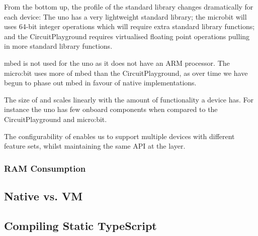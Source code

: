 From the bottom up, the profile of the standard library changes dramatically for each device: The uno has a very lightweight standard library; the microbit will uses 64-bit integer operations which will require extra standard library functions; and the CircuitPlayground requires virtualised floating point operations pulling in more standard library functions.

mbed is not used for the uno as it does not have an ARM processor. The micro:bit uses more of mbed than the CircuitPlayground, as over time we have begun to phase out mbed in favour of native implementations.

The size of \CO and \MC scales linearly with the amount of functionality a device has. For instance the uno has few onboard components when compared to the CircuitPlayground and micro:bit.

The configurability of \CO enables us to support multiple devices with different feature sets, whilst maintaining the same API at the \MC layer.

\subsubsection{RAM Consumption}




\subsection{\MC Native vs. \MC VM}

\subsection{Compiling Static TypeScript}

